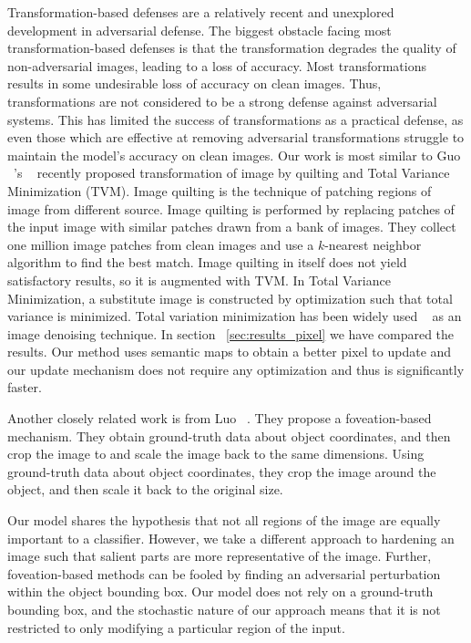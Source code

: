 Transformation-based defenses are a relatively recent and unexplored development in adversarial defense. 
The biggest obstacle facing most transformation-based defenses is that the transformation degrades the quality of non-adversarial images, leading to a loss of accuracy.
Most transformations results in some undesirable loss of accuracy on clean images. 
Thus, transformations are not considered to be a strong defense against adversarial systems.
This has limited the success of transformations as a practical defense, as even those which are effective at removing adversarial transformations struggle to maintain the model's accuracy on clean images.
Our work is most similar to Guo ~\etal's ~\cite{CounteringAIGuo17} recently proposed transformation of image by quilting and Total Variance Minimization (TVM). 
Image quilting is the technique of patching regions of image from different source.
Image quilting is performed by replacing patches of the input image with similar patches drawn from a bank of images.
They collect one million image patches from clean images and use a $k$-nearest neighbor algorithm to find the best match.
Image quilting in itself does not yield satisfactory results, so it is augmented with TVM.
In Total Variance Minimization, a substitute image is constructed by optimization such that total variance is minimized.
Total variation minimization has been widely used ~\cite{Getreuer2012RudinOsherFatemiTV} as an image denoising technique. 
In section ~\ref{sec:results_pixel} we have compared the results. 
Our method uses semantic maps to obtain a better pixel to update and our update mechanism does not require any optimization and thus is significantly faster.

Another closely related work is from Luo \etal ~\cite{FoveationbasedMALuo2015}. They propose a foveation-based mechanism.
They obtain ground-truth data about object coordinates, and then crop the image to and scale the image back to the same dimensions.
Using ground-truth data about object coordinates, they crop the image around the object, and then scale it back to the original size.

Our model shares the hypothesis that not all regions of the image are equally important to a classifier.
However, we take a different approach to hardening an image such that salient parts are more representative of the image.
Further, foveation-based methods can be fooled by finding an adversarial perturbation within the object bounding box.
Our model does not rely on a ground-truth bounding box, and the stochastic nature of our approach means that it is not restricted to only modifying a particular region of the input.

